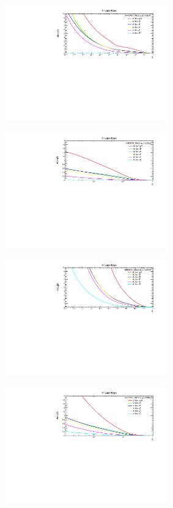 \begin{figure}[H]
\centering
\begin{subfigure}{0.45\textwidth}
\includegraphics[height=5cm ,width=\textwidth]{chapter4/barxfx10gev.pdf}
\vspace*{-8mm}
\caption{}
\end{subfigure}
\begin{subfigure}{0.45\textwidth}
\includegraphics[height=5cm, width=\textwidth]{chapter4/barxfx10gev1.pdf}
\vspace*{-8mm}
\caption{}
\end{subfigure}
\begin{subfigure}{0.45\textwidth}
\includegraphics[height=5cm, width=\textwidth]{chapter4/barxfx100gev.pdf}
\vspace*{-8mm}
\caption{}
\end{subfigure}
\begin{subfigure}{0.45\textwidth}
\includegraphics[height=5cm, width=\textwidth]{chapter4/barxfx100gev1.pdf}

\end{subfigure}
\end{figure}
